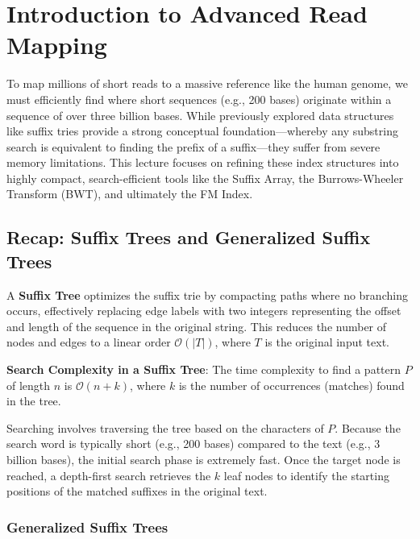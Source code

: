 


\section{Introduction to Advanced Read Mapping}

To map millions of short reads to a massive reference like the human genome, we must efficiently find where short sequences (e.g., 200 bases) originate within a sequence of over three billion bases. While previously explored data structures like suffix tries provide a strong conceptual foundation—whereby any substring search is equivalent to finding the prefix of a suffix—they suffer from severe memory limitations. This lecture focuses on refining these index structures into highly compact, search-efficient tools like the Suffix Array, the Burrows-Wheeler Transform (BWT), and ultimately the FM Index.

\subsection{Recap: Suffix Trees and Generalized Suffix Trees}

A \textbf{Suffix Tree} optimizes the suffix trie by compacting paths where no branching occurs, effectively replacing edge labels with two integers representing the offset and length of the sequence in the original string. This reduces the number of nodes and edges to a linear order \( \mathcal{O}(|T|) \), where \( T \) is the original input text.

\begin{important}
  \textbf{Search Complexity in a Suffix Tree}: The time complexity to find a pattern \( P \) of length \( n \) is \( \mathcal{O}(n + k) \), where \( k \) is the number of occurrences (matches) found in the tree. 
\end{important}

Searching involves traversing the tree based on the characters of \( P \). Because the search word is typically short (e.g., 200 bases) compared to the text (e.g., 3 billion bases), the initial search phase is extremely fast. Once the target node is reached, a depth-first search retrieves the \( k \) leaf nodes to identify the starting positions of the matched suffixes in the original text.

\subsubsection{Generalized Suffix Trees}

